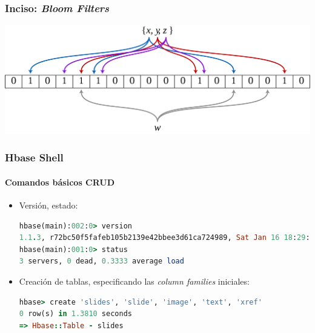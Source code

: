 \documentclass[14pt]{beamer}
\begin{document}
\begin{frame}
\begin{itemize}
\begin{frame}
  \frametitle{Inciso: {\em Bloom Filters}}
\includegraphics[width=\textwidth]{img/bloom_filter}
\end{frame}


\begin{frame}
  \frametitle{Hbase Shell}
\framesubtitle{Comandos básicos CRUD}
\begin{itemize}
\item Versión, estado:

\begin{lstlisting}[language=ruby]
hbase(main):002:0> version
1.1.3, r72bc50f5fafeb105b2139e42bbee3d61ca724989, Sat Jan 16 18:29:00 PST 2016
hbase(main):001:0> status
3 servers, 0 dead, 0.3333 average load
\end{lstlisting}

\framebreak

\item Creación de tablas, especificando las {\em column families}
  iniciales:
\begin{lstlisting}[language=ruby]
hbase> create 'slides', 'slide', 'image', 'text', 'xref'
0 row(s) in 1.3810 seconds
=> Hbase::Table - slides
\end{lstlisting}


\end{itemize}
\end{frame}
\end{itemize}
\end{frame}
\end{document}
